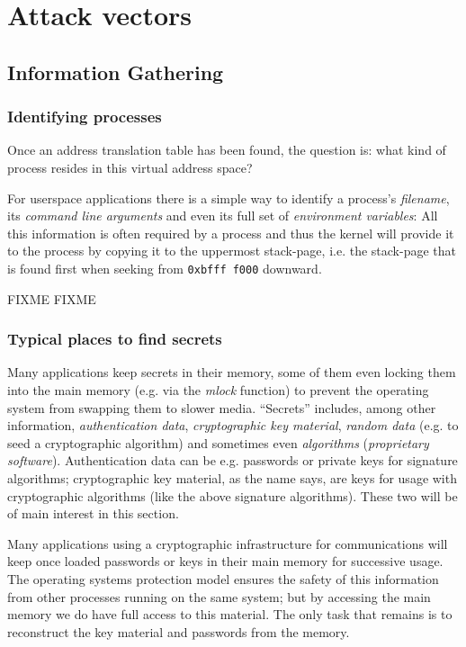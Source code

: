 %
%

\section{Attack vectors}




\subsection{Information Gathering}

\subsubsection{Identifying processes}

Once an address translation table has been found, the question is: what kind of
process resides in this virtual address space?

For userspace applications there is a simple way to identify a process's
\emph{filename}, its \emph{command line arguments} and even its full set of
\emph{environment variables}: All this information is often required by a
process and thus the kernel will provide it to the process by copying it to the
uppermost stack-page, i.e.  the stack-page that is found first when seeking from
\texttt{0xbfff~f000} downward.

FIXME FIXME

\subsubsection{Typical places to find secrets}

Many applications keep secrets in their memory, some of them even locking them
into the main memory (e.g. via the \emph{mlock} function) to prevent the
operating system from swapping them to slower media. ``Secrets'' includes, among
other information, \emph{authentication data}, \emph{cryptographic key
material}, \emph{random data} (e.g. to seed a cryptographic algorithm) and
sometimes even \emph{algorithms} (\emph{proprietary software}). Authentication
data can be e.g.  passwords or private keys for signature algorithms;
cryptographic key material, as the name says, are keys for usage with
cryptographic algorithms (like the above signature algorithms). These two will
be of main interest in this section.

Many applications using a cryptographic infrastructure for communications will
keep once loaded passwords or keys in their main memory for successive usage.
The operating systems protection model ensures the safety of this information
from other processes running on the same system; but by accessing the main
memory we do have full access to this material. The only task that remains is to
reconstruct the key material and passwords from the memory.

